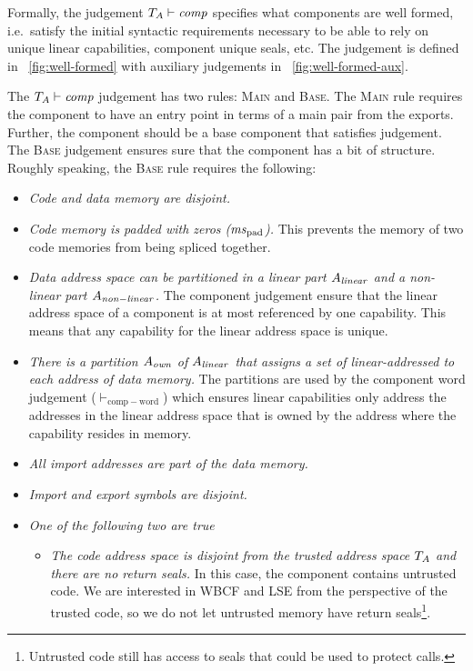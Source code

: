 \documentclass[acmsmall,screen]{acmart}\settopmatter{}
\renewcommand{\comp}{\var{comp}}
\newcommand{\wdjud}[2][ ]{#1 \vdash #2}
\newenvironment{jversion}%
    {\color{OliveGreen}}{}
\begin{document}
\begin{jversion}
Formally, the judgement $\wdjud[\ta]{\comp}$ specifies what components are well formed, i.e.\ satisfy the initial syntactic requirements necessary to be able to rely on unique linear capabilities, component unique seals, etc.
The judgement is defined in \figurename~\ref{fig:well-formed} with auxiliary judgements in \figurename~\ref{fig:well-formed-aux}.

The $\wdjud[\ta]{\comp}$ judgement has two rules: \textsc{Main} and \textsc{Base}.
The \textsc{Main} rule requires the component to have an entry point in terms of a main pair from the exports.
Further, the component should be a base component that satisfies judgement.
The \textsc{Base} judgement ensures sure that the component has a bit of structure.
Roughly speaking, the \textsc{Base} rule requires the following:
\begin{itemize}
\item \textit{Code and data memory are disjoint.}
\item \textit{Code memory is padded with zeros ($\mspad$).} This prevents the memory of two code memories from being spliced together.
\item \textit{Data address space can be partitioned in a linear part $A_{\mathit{linear}}$ and a non-linear part $A_{\mathit{non-linear}}$.} The component judgement ensure that the linear address space of a component is at most referenced by one capability. This means that any capability for the linear address space is unique.
\item \textit{There is a partition $A_{\mathit{own}}$ of $A_{\mathit{linear}}$ that assigns a set of linear-addressed to each address of data memory.} The partitions are used by the component word judgement ($\vdash_\mathrm{comp-word}$) which ensures linear capabilities only address the addresses in the linear address space that is owned by the address where the capability resides in memory.
\item \textit{All import addresses are part of the data memory.} 
\item \textit{Import and export symbols are disjoint.}
\item \textit{One of the following two are true}
  \begin{itemize}
  \item \textit{The code address space is disjoint from the trusted address space $T_{A}$ and there are no return seals.} In this case, the component contains untrusted code. We are interested in WBCF and LSE from the perspective of the trusted code, so we do not let untrusted memory have return seals\footnote{Untrusted code still has access to seals that could be used to protect calls.}.

\end{itemize}
\end{itemize}
\end{jversion}
\end{document}
